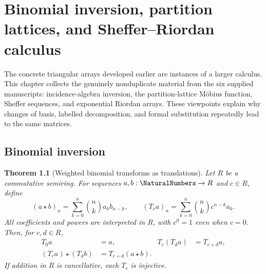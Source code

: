 \documentclass[11pt,a4paper,oneside,openany]{book}
\newtheorem{theorem}{Theorem}[chapter]
\theoremstyle{definition}
\theoremstyle{remark}
\begin{document}
\chapter{Binomial inversion, partition lattices, and Sheffer--Riordan calculus}
\label{ch:merged-umbral}

The concrete triangular arrays developed earlier are instances of a larger
calculus.  This chapter collects the genuinely nonduplicate material from the
six supplied manuscripts: incidence-algebra inversion, the partition-lattice Möbius
function, Sheffer sequences, and exponential Riordan arrays.  These viewpoints
explain why changes of basis, labelled decomposition, and formal substitution
repeatedly lead to the same matrices.

\section{Binomial inversion}

\begin{theorem}[Weighted binomial transforms as translations]
\label{thm:merged-weighted-binomial-translation}
Let $R$ be a commutative semiring.  For sequences $a,b:\NaturalNumbers\to R$
and $c\in R$, define
\[
 (a\star b)_n=\sum_{k=0}^n\binom nk a_kb_{n-k},\qquad
 (T_ca)_n=\sum_{k=0}^n\binom nk c^{n-k}a_k.
\]
All coefficients and powers are interpreted in $R$, with $c^0=1$ even when
$c=0$.  Then, for $c,d\in R$,
\begin{align}
 T_0a&=a,& T_c(T_da)&=T_{c+d}a,                                  \label{eq:merged-weighted-translation-law}\\
 (T_ca)\star(T_db)&=T_{c+d}(a\star b).                            \label{eq:merged-weighted-convolution-law}
\end{align}
If addition in $R$ is cancellative, each $T_c$ is injective.
\end{theorem}
\end{document}
